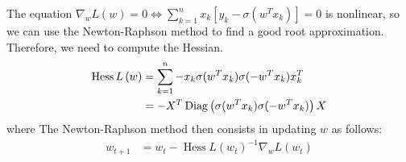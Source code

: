 \documentclass[a4paper, 11pt]{report}
\DeclareMathOperator{\Hessian}{Hess}
\begin{document}
    The equation $ \nabla_w L \left( w \right) = 0 \iff \sum_{k=1}^{n} x_k \left[y_k  - \sigma(w^Tx_k) \right] = 0$ is nonlinear, so we can use the Newton-Raphson method to find a good root approximation. Therefore, we need to compute the Hessian. 
    \begin{equation*}
        \begin{aligned}
        \Hessian L \left( w \right) &= \sum_{k=1}^{n} -x_k \sigma(w^Tx_k) \sigma(-w^Tx_k)x_k^T \\
        &= - X^T \Diag\left(\sigma(w^Tx_k) \sigma(-w^Tx_k)\right)X \\
        \end{aligned}
    \end{equation*}
    where The Newton-Raphson method then consists in updating $w$ as follows:
    \begin{equation*}
        \begin{aligned}
        w_{t+1} &= w_t - \Hessian L \left( w_t \right)^{-1} \nabla_w L \left(w_t\right) 
        \end{aligned}
    \end{equation*}
\end{document}

